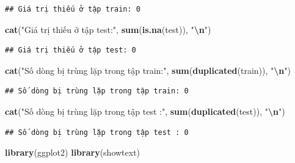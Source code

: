 \documentclass[
]{article}
\newenvironment{Shaded}{\begin{snugshade}}{\end{snugshade}}
\newcommand{\FunctionTok}[1]{\textcolor[rgb]{0.13,0.29,0.53}{\textbf{#1}}}
\newcommand{\NormalTok}[1]{#1}
\newcommand{\SpecialCharTok}[1]{\textcolor[rgb]{0.81,0.36,0.00}{\textbf{#1}}}
\newcommand{\StringTok}[1]{\textcolor[rgb]{0.31,0.60,0.02}{#1}}
\begin{document}
\begin{verbatim}
## Giá trị thiếu ở tập train: 0
\end{verbatim}

\begin{Shaded}
\begin{Highlighting}[]
\FunctionTok{cat}\NormalTok{(}\StringTok{"Giá trị thiếu ở tập test:"}\NormalTok{, }\FunctionTok{sum}\NormalTok{(}\FunctionTok{is.na}\NormalTok{(test)), }\StringTok{"}\SpecialCharTok{\textbackslash{}n}\StringTok{"}\NormalTok{)}
\end{Highlighting}
\end{Shaded}

\begin{verbatim}
## Giá trị thiếu ở tập test: 0
\end{verbatim}

\begin{Shaded}
\begin{Highlighting}[]
\FunctionTok{cat}\NormalTok{(}\StringTok{"Số dòng bị trùng lặp trong tập train:"}\NormalTok{, }\FunctionTok{sum}\NormalTok{(}\FunctionTok{duplicated}\NormalTok{(train)), }\StringTok{"}\SpecialCharTok{\textbackslash{}n}\StringTok{"}\NormalTok{)}
\end{Highlighting}
\end{Shaded}

\begin{verbatim}
## Số dòng bị trùng lặp trong tập train: 0
\end{verbatim}

\begin{Shaded}
\begin{Highlighting}[]
\FunctionTok{cat}\NormalTok{(}\StringTok{"Số dòng bị trùng lặp trong tập test :"}\NormalTok{, }\FunctionTok{sum}\NormalTok{(}\FunctionTok{duplicated}\NormalTok{(test)), }\StringTok{"}\SpecialCharTok{\textbackslash{}n}\StringTok{"}\NormalTok{)}
\end{Highlighting}
\end{Shaded}

\begin{verbatim}
## Số dòng bị trùng lặp trong tập test : 0
\end{verbatim}

\begin{Shaded}
\begin{Highlighting}[]
\FunctionTok{library}\NormalTok{(ggplot2)}
\FunctionTok{library}\NormalTok{(showtext)}
\end{Highlighting}
\end{Shaded}
\end{document}
